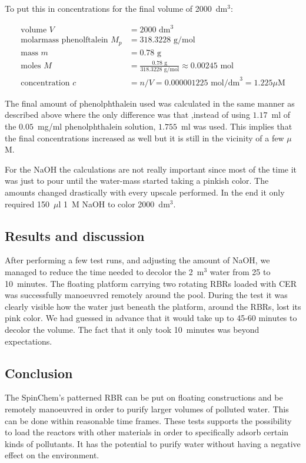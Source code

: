 To put this in concentrations for the final volume of 2000~dm$^3$:

\begin{align}
    \text{volume } V &= 2000 \text{ dm}^3 \\
    \text{molarmass phenolftalein } M_p &= 318.3228 \text{ g/mol} \\
    \text{mass } m &= 0.78 \text{ g} \\
    \text{moles } M &= \frac{0.78 \text{ g}}{318.3228 \text{ g/mol}} \approx 0.00245 \text{ mol} \\
    \text{concentration } c &= n/V = 0.000001225 \text{ mol/dm}^3 = 1.225 \mu\text{M}
\end{align}

The final amount of phenolphthalein used was calculated in the same manner as described above where the only difference was that ,instead of using $1.17$~ml of the $0.05$~mg/ml phenolphthalein solution, $1.755$~ml was used.
This implies that the final concentrations increased as well but it is still in the vicinity of a few $\mu$M.

For the NaOH the calculations are not really important since most of the time it was just to pour until the water-mass started taking a pinkish color. The amounts changed drastically with every upscale performed. In the end it only required 150~$\mu$l 1~M NaOH to color 2000~dm$^3$.

\subsection{Results and discussion}
After performing a few test runs, and adjusting the amount of NaOH, we managed to reduce the time needed to decolor the 2~m$^3$ water from 25 to 10~minutes. The floating platform carrying two rotating RBRs loaded with CER was successfully manoeuvred remotely around the pool. During the test it was clearly visible how the water just beneath the platform, around the RBRs, lost its pink color.
We had guessed in advance that it would take up to 45-60 minutes to decolor the volume. The fact that it only took 10~minutes was beyond expectations.

\subsection{Conclusion}
The SpinChem\textsuperscript{\textregistered}'s patterned RBR can be put on floating constructions and be remotely manoeuvred in order to purify larger volumes of polluted water. This can be done within reasonable time frames. These tests supports the possibility to load the reactors with other materials in order to specifically adsorb certain kinds of pollutants. It has the potential to purify water without having a negative effect on the environment.
